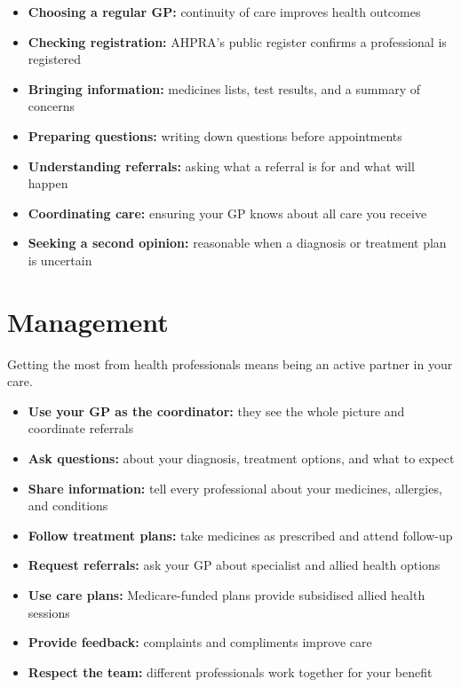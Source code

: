 \begin{itemize}
    \item \textbf{Choosing a regular GP:} continuity of care improves health outcomes
    \item \textbf{Checking registration:} AHPRA's public register confirms a professional is registered
    \item \textbf{Bringing information:} medicines lists, test results, and a summary of concerns
    \item \textbf{Preparing questions:} writing down questions before appointments
    \item \textbf{Understanding referrals:} asking what a referral is for and what will happen
    \item \textbf{Coordinating care:} ensuring your GP knows about all care you receive
    \item \textbf{Seeking a second opinion:} reasonable when a diagnosis or treatment plan is uncertain
\end{itemize}

\section*{Management}
Getting the most from health professionals means being an active partner in your care.

\begin{itemize}
    \item \textbf{Use your GP as the coordinator:} they see the whole picture and coordinate referrals
    \item \textbf{Ask questions:} about your diagnosis, treatment options, and what to expect
    \item \textbf{Share information:} tell every professional about your medicines, allergies, and conditions
    \item \textbf{Follow treatment plans:} take medicines as prescribed and attend follow-up
    \item \textbf{Request referrals:} ask your GP about specialist and allied health options
    \item \textbf{Use care plans:} Medicare-funded plans provide subsidised allied health sessions
    \item \textbf{Provide feedback:} complaints and compliments improve care
    \item \textbf{Respect the team:} different professionals work together for your benefit
\end{itemize}

